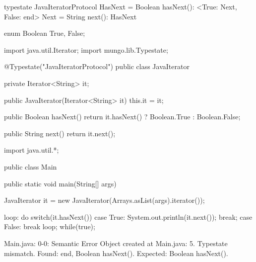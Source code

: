 \begin{code}
typestate JavaIteratorProtocol {
  HasNext = {
    Boolean hasNext(): <True: Next, False: end>
  }
  Next = {
    String next(): HasNext
  }
}\end{code}

\begin{code}
enum Boolean {
	True, False;
}\end{code}

\begin{code}
import java.util.Iterator;
import mungo.lib.Typestate;

@Typestate("JavaIteratorProtocol")
public class JavaIterator {

  private Iterator<String> it;

  public JavaIterator(Iterator<String> it) {
    this.it = it;
  }

	public Boolean hasNext() {
    return it.hasNext() ? Boolean.True : Boolean.False;
  }

  public String next() {
    return it.next();
  }

}\end{code}

\begin{code}
import java.util.*;

public class Main {
	public static void main(String[] args) {
		JavaIterator it = new JavaIterator(Arrays.asList(args).iterator());

    loop: do {
      switch(it.hasNext()) {
        case True:
          System.out.println(it.next());
          break;
        case False:
          break loop;
      }
    } while(true);
	}
}\end{code}

\lstset{language=,caption=Mungo's output}
\begin{code}

Main.java: 0-0: Semantic Error
		Object created at Main.java: 5. Typestate mismatch. Found: end, Boolean hasNext(). Expected: Boolean hasNext().
\end{code}

